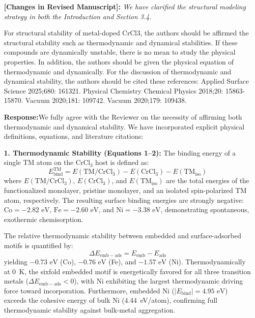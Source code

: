 \documentclass[11pt, sans, a4paper]{moderncv}
\newcommand{\response}{\vspace{0.4em}\noindent\textbf{\color{actionblue}Response:}\hspace{0.5em}}
\newcommand{\manuscriptchange}[1]{\vspace{0.3em}\noindent\textbf{\color{acsblue}[Changes in Revised Manuscript]:} \textit{#1}\vspace{0.4em}}
\begin{document}
\manuscriptchange{We have clarified the structural modeling strategy in both the Introduction and Section 3.4.}

\begin{reviewercomment}
For structural stability of metal-doped CrCl3, the authors should be affirmed the structural stability such as thermodynamic and dynamical stabilities. If these compounds are dynamically unstable, there is no mean to study the physical properties. In addition, the authors should be given the physical equation of thermodynamic and dynamically. For the discussion of thermodynamic and dynamical stability, the authors should be cited these references: Applied Surface Science 2025;680: 161321. Physical Chemistry Chemical Physics 2018;20: 15863-15870. Vacuum 2020;181: 109742. Vacuum 2020;179: 109438.
\end{reviewercomment}

\response We fully agree with the Reviewer on the necessity of affirming both thermodynamic and dynamical stability. We have incorporated explicit physical definitions, equations, and literature citations:

\noindent\textbf{1. Thermodynamic Stability (Equations 1--2):}
The binding energy of a single TM atom on the $\text{CrCl}_3$ host is defined as:
\begin{equation}
E_{\mathrm{bind}}^{\mathrm{TM}} = E(\mathrm{TM}/\mathrm{CrCl}_3) - E(\mathrm{CrCl}_3) - E(\mathrm{TM}_{\mathrm{iso}})
\end{equation}
where $E(\mathrm{TM}/\mathrm{CrCl}_3)$, $E(\mathrm{CrCl}_3)$, and $E(\mathrm{TM}_{\mathrm{iso}})$ are the total energies of the functionalized monolayer, pristine monolayer, and an isolated spin-polarized TM atom, respectively. The resulting surface binding energies are strongly negative: $\text{Co} = -2.82\text{ eV}$, $\text{Fe} = -2.60\text{ eV}$, and $\text{Ni} = -3.38\text{ eV}$, demonstrating spontaneous, exothermic chemisorption.

The relative thermodynamic stability between embedded and surface-adsorbed motifs is quantified by:
\begin{equation}
\Delta E_{\mathrm{emb-ads}} = E_{\mathrm{emb}} - E_{\mathrm{ads}}
\end{equation}
yielding $-0.73\text{ eV}$ (Co), $-0.76\text{ eV}$ (Fe), and $-1.57\text{ eV}$ (Ni). Thermodynamically at 0~K, the sixfold embedded motif is energetically favored for all three transition metals ($\Delta E_{\mathrm{emb-ads}} < 0$), with Ni exhibiting the largest thermodynamic driving force toward incorporation. Furthermore, embedded Ni ($|E_{\mathrm{bind}}| = 4.95\text{ eV}$) exceeds the cohesive energy of bulk Ni (4.44~eV/atom), confirming full thermodynamic stability against bulk-metal aggregation.
\end{document}
